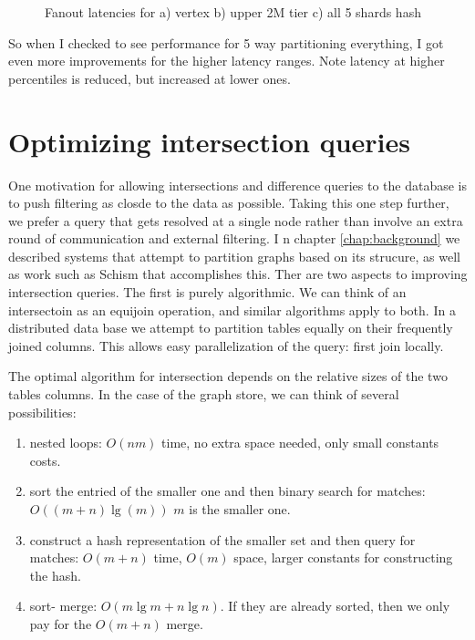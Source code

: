 \begin{figure}
  \begin{center}
  \end{center}
  \caption{Fanout latencies for a) vertex b) upper 2M tier c) all 5 shards hash}
  \label{fig:fanout}

\end{figure}

So when I checked to see performance for 5 way partitioning everything, I got even more improvements for the higher latency ranges. Note latency at higher percentiles is reduced, but increased at lower ones. 




\chapter{Optimizing intersection queries}

One motivation for allowing intersections and difference queries to the database is to push filtering as closde to the data as possible. Taking this one step further,  we prefer a query that gets resolved at a single node rather than involve an extra round of communication and external filtering.
I n chapter \ref{chap:background} we described systems that attempt to partition graphs based on its strucure, as well as work such as Schism \cite{schism} that accomplishes this. Ther are two aspects to improving intersection queries. The first is purely algorithmic. We can think of an intersectoin as an equijoin operation, and similar algorithms apply to both. In a distributed data base we attempt to partition tables equally on their frequently joined columns.  This allows easy parallelization of the query: first join locally.  

The optimal algorithm for intersection depends on the relative sizes of the two tables columns. In the case of the graph store, we can think of several possibilities:

\begin{enumerate}
\item nested loops: $O(nm)$ time, no extra space needed, only small constants costs.
\item sort the entried of the smaller one and then binary search for matches: $O((m + n)\lg{(m)})$ $m$ is the smaller one.
\item construct a hash representation of the smaller set and then query for matches: $O(m + n)$ time, $O(m)$ space, larger constants for constructing the hash.
\item sort- merge: $O(m \lg{m} + n \lg{n})$. If they are already sorted, then we only pay for the  $O(m + n)$ merge.
\end{enumerate}

